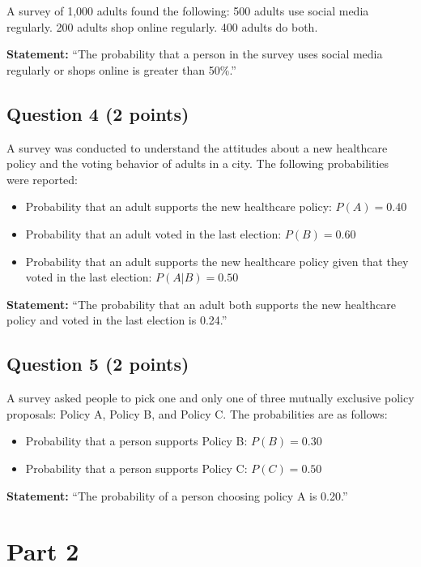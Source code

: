 \documentclass{article}
\begin{document}
A survey of 1,000 adults found the following: 500 adults use social media regularly. 200 adults shop online regularly. 400 adults do both.

\textbf{Statement:} ``The probability that a person in the survey uses social media regularly or shops online is greater than 50\%.''

\subsection*{Question 4 (2 points)}

A survey was conducted to understand the attitudes about a new healthcare policy and the voting behavior of adults in a city. The following probabilities were reported:
\begin{itemize}
    \item Probability that an adult supports the new healthcare policy: \( P(A) = 0.40 \)
    \item Probability that an adult voted in the last election: \( P(B) = 0.60 \)
    \item Probability that an adult supports the new healthcare policy given that they voted in the last election: \( P(A|B) = 0.50 \)
\end{itemize}

\textbf{Statement:} ``The probability that an adult both supports the new healthcare policy and voted in the last election is 0.24.''

\subsection*{Question 5 (2 points)}

A survey asked people to pick one and only one of three mutually exclusive policy proposals: Policy A, Policy B, and Policy C. The probabilities are as follows:
\begin{itemize}
    \item Probability that a person supports Policy B: \( P(B) = 0.30 \)
    \item Probability that a person supports Policy C: \( P(C) = 0.50 \)
\end{itemize}

\textbf{Statement:} ``The probability of a person choosing policy A is 0.20.''

\section*{Part 2}
\end{document}
